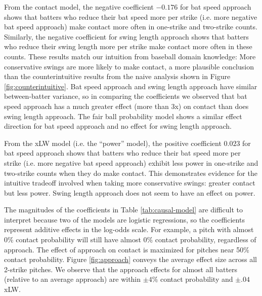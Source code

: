 \documentclass{article}
\begin{document}
      From the contact model, the negative coefficient $-0.176$ for bat speed approach shows that batters who reduce their bat speed more per strike (i.e. more negative bat speed approach) make contact more often in one-strike and two-strike counts. Similarly, the negative coefficient for swing length approach shows that batters who reduce their swing length more per strike make contact more often in these counts. These results match our intuition from baseball domain knowledge: More conservative swings are more likely to make contact, a more plausible conclusion than the counterintuitive results from the naive analysis shown in Figure \ref{fig:counterintuitive}. Bat speed approach and swing length approach have similar between-batter variance, so in comparing the coefficients we observed that bat speed approach has a much greater effect (more than 3x) on contact than does swing length approach. The fair ball probability model shows a similar effect direction for bat speed approach and no effect for swing length approach.

      From the xLW model (i.e. the ``power'' model), the positive coefficient $0.023$ for bat speed approach shows that batters who reduce their bat speed more per strike (i.e. more negative bat speed approach) exhibit less power in one-strike and two-strike counts when they do make contact. This demonstrates evidence for the intuitive tradeoff involved when taking more conservative swings: greater contact but less power. Swing length approach does not seem to have an effect on power.

      The magnitudes of the coefficients in Table \ref{tab:causal-model} are difficult to interpret because two of the models are logistic regressions, so the coefficients represent additive effects in the log-odds scale. For example, a pitch with almost 0\% contact probability will still have almost 0\% contact probability, regardless of approach. The effect of approach on contact is maximized for pitches near 50\% contact probability. Figure \ref{fig:approach} conveys the average effect size across all 2-strike pitches. We observe that the approach effects for almost all batters (relative to an average approach) are within $\pm4\%$ contact probability and $\pm.04$ xLW.
\end{document}
